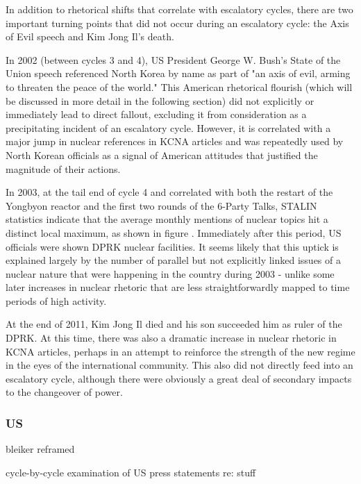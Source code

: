 \documentclass{article}
\begin{document}
In addition to rhetorical shifts that correlate with escalatory cycles, there are two important turning points that did not occur during an escalatory cycle: the Axis of Evil speech and Kim Jong Il's death.

In 2002 (between cycles 3 and 4), US President George W. Bush's State of the Union speech referenced North Korea by name as part of "an axis of evil, arming to threaten the peace of the world."\cite{sotu02} This American rhetorical flourish (which will be discussed in more detail in the following section) did not explicitly or immediately lead to direct fallout, excluding it from consideration as a precipitating incident of an escalatory cycle. However, it is correlated with a major jump in nuclear references in KCNA articles \cite{rich14} and was repeatedly used by North Korean officials as a signal of American attitudes that justified the magnitude of their actions\cite{bleiker}.

In 2003, at the tail end of cycle 4 and correlated with both the restart of the Yongbyon reactor and the first two rounds of the 6-Party Talks, STALIN statistics indicate that the average monthly mentions of nuclear topics hit a distinct local maximum, as shown in figure . Immediately after this period, US officials were shown DPRK nuclear facilities. It seems likely that this uptick is explained largely by the number of parallel but not explicitly linked issues of a nuclear nature that were happening in the country during 2003 - unlike some later increases in nuclear rhetoric that are less straightforwardly mapped to time periods of high activity.

At the end of 2011, Kim Jong Il died and his son succeeded him as ruler of the DPRK. At this time, there was also a dramatic increase in nuclear rhetoric in KCNA articles, perhaps in an attempt to reinforce the strength of the new regime in the eyes of the international community\cite{rich14}. This also did not directly feed into an escalatory cycle, although there were obviously a great deal of secondary impacts to the changeover of power.

\subsubsection{US}
bleiker reframed

cycle-by-cycle examination of US press statements re: stuff

\end{document}

